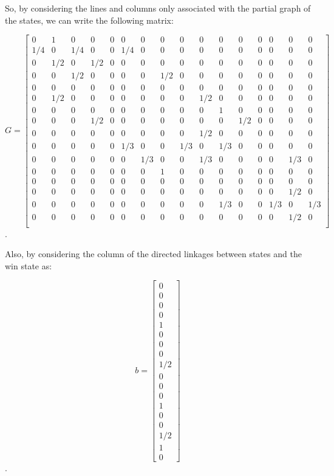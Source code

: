 \documentclass{article}
\begin{document}
    So, by considering the lines and columns only associated with the partial graph of the states, we can write the following matrix:

    \setcounter{MaxMatrixCols}{20}
$$G = \begin{bmatrix}
0 & 1 & 0 & 0 & 0 & 0 & 0 & 0 & 0 & 0 & 0 & 0 & 0 & 0 & 0 & 0 \\
1/4 & 0 & 1/4 & 0 & 0 & 1/4 & 0 & 0 & 0 & 0 & 0 & 0 & 0 & 0 & 0 & 0\\
0 & 1/2 & 0 & 1/2 & 0 & 0 & 0 & 0 & 0 & 0 & 0 & 0 & 0 & 0 & 0 & 0\\
0 & 0 & 1/2 & 0 & 0 & 0 & 0 & 1/2 & 0 & 0 & 0 & 0 & 0 & 0 & 0 & 0\\
0 & 0 & 0 & 0 & 0 & 0 & 0 & 0 & 0 & 0 & 0 & 0 & 0 & 0 & 0 & 0\\
0 & 1/2 & 0 & 0 & 0 & 0 & 0 & 0 & 0 & 1/2 & 0 & 0 & 0 & 0 & 0 & 0\\
0 & 0 & 0 & 0 & 0 & 0 & 0 & 0 & 0 & 0 & 1 & 0 & 0 & 0 & 0 & 0\\
0 & 0 & 0 & 1/2 & 0 & 0 & 0 & 0 & 0 & 0 & 0 & 1/2 & 0 & 0 & 0 & 0\\
0 & 0 & 0 & 0 & 0 & 0 & 0 & 0 & 0 & 1/2 & 0 & 0 & 0 & 0 & 0 & 0\\
0 & 0 & 0 & 0 & 0 & 1/3 & 0 & 0 & 1/3 & 0 & 1/3 & 0 & 0 & 0 & 0 & 0\\
0 & 0 & 0 & 0 & 0 & 0 & 1/3 & 0 & 0 & 1/3 & 0 & 0 & 0 & 0 & 1/3 & 0\\
0 & 0 & 0 & 0 & 0 & 0 & 0 & 1 & 0 & 0 & 0 & 0 & 0 & 0 & 0 & 0\\
0 & 0 & 0 & 0 & 0 & 0 & 0 & 0 & 0 & 0 & 0 & 0 & 0 & 0 & 0 & 0\\
0 & 0 & 0 & 0 & 0 & 0 & 0 & 0 & 0 & 0 & 0 & 0 & 0 & 0 & 1/2 & 0\\
0 & 0 & 0 & 0 & 0 & 0 & 0 & 0 & 0 & 0 & 1/3 & 0 & 0 & 1/3 & 0 & 1/3\\
0 & 0 & 0 & 0 & 0 & 0 & 0 & 0 & 0 & 0 & 0 & 0 & 0 & 0 & 1/2 & 0\\
\end{bmatrix}$$.

Also, by considering the column of the directed linkages between states and the win state as:

\setcounter{MaxMatrixCols}{20}
$$b=\begin{bmatrix}
0\\
0\\
0\\
0\\
1\\
0\\
0\\
0\\
1/2\\
0\\
0\\
0\\
1\\
0\\
0\\
1/2\\
1\\
0
\end{bmatrix}$$.
\end{document}
